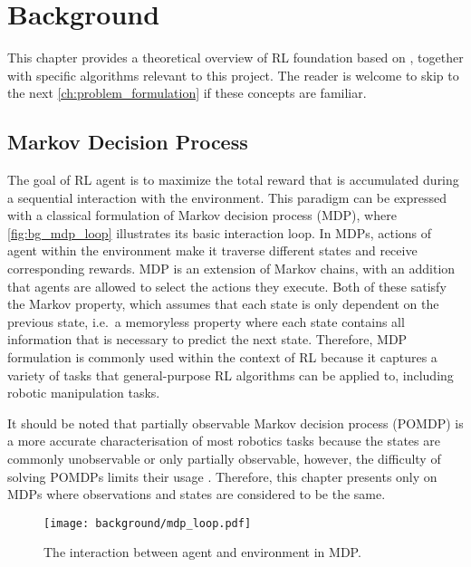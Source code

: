 \chapter{Background}\label{ch:background}

This chapter provides a theoretical overview of RL foundation based on \citet{sutton_reinforcement_2018}, together with specific algorithms relevant to this project. The reader is welcome to skip to the next \autoref{ch:problem_formulation} if these concepts are familiar.


\section{Markov Decision Process}

The goal of RL agent is to maximize the total reward that is accumulated during a sequential interaction with the environment. This paradigm can be expressed with a classical formulation of Markov decision process (MDP), where \autoref{fig:bg_mdp_loop} illustrates its basic interaction loop. In MDPs, actions of agent within the environment make it traverse different states and receive corresponding rewards. MDP is an extension of Markov chains, with an addition that agents are allowed to select the actions they execute. Both of these satisfy the Markov property, which assumes that each state is only dependent on the previous state, i.e.~a memoryless property where each state contains all information that is necessary to predict the next state. Therefore, MDP formulation is commonly used within the context of RL because it captures a variety of tasks that general-purpose RL algorithms can be applied to, including robotic manipulation tasks.

It should be noted that partially observable Markov decision process (POMDP) is a more accurate characterisation of most robotics tasks because the states are commonly unobservable or only partially observable, however, the difficulty of solving POMDPs limits their usage \cite{kroemer_review_2021}. Therefore, this chapter presents only on MDPs where observations and states are considered to be the same.

\begin{figure}[ht]
    \centering
    \texttt{[image: background/mdp\_loop.pdf]}
    \caption{The interaction between agent and environment in MDP.~\protect\cite{sutton_reinforcement_2018}}
    \label{fig:bg_mdp_loop}
\end{figure}

